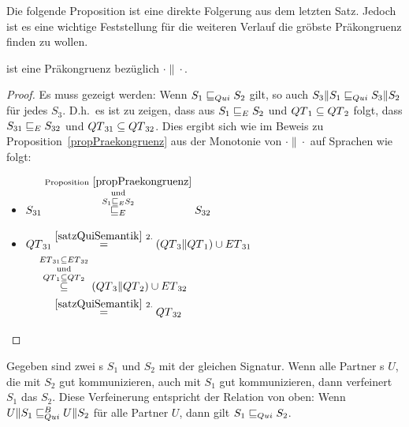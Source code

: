 Die folgende Proposition ist eine direkte Folgerung aus dem letzten Satz.
Jedoch ist es eine wichtige Feststellung für die weiteren Verlauf die gröbste
Präkongruenz finden zu wollen.

\begin{prop}[Präkongruenz]
  \label{propQuiPrae}
  \QRel{} ist eine Präkongruenz bezüglich $\cdot\|\cdot$.
\end{prop}

\begin{proof}
  Es muss gezeigt werden: Wenn $S_1\sqsubseteq _{Qui} S_2$ gilt, so auch
  $S_3\|S_1\sqsubseteq _{Qui} S_3\|S_2$ für jedes $S_3$. D.h.\ es ist zu zeigen, dass aus
  $S_1\sqsubseteq _E S_2$ und $QT{}_1\subseteq QT{}_2$ folgt, dass $S_{31}\sqsubseteq _E
  S_{32}$ und $QT{}_{31}\subseteq QT{}_{32}$. Dies ergibt sich wie im Beweis
  zu Proposition~\ref{propPraekongruenz} aus der Monotonie von $\cdot\|\cdot$
  auf Sprachen wie folgt:
  \begin{itemize}
    \item $\begin{aligned}[t]
        S_{31} \overset{\mathrm{Proposition}~
        \ref{propPraekongruenz}}{\overset{\mathrm{und}}{\overset{S_1\sqsubseteq _E
    S_2}{\sqsubseteq _E}}} S_{32}
    \end{aligned}$
    \item $\begin{aligned}[t]
        \QT{}_{31} &\overset{\ref{satzQuiSemantik}~2.}{=}
        (\QT{}_3\|\QT{}_1)\cup \ET{}_{31}\\
        &\hspace{-0.5cm}\overset{\ET{}_{31}\subseteq
      \ET{}_{32}}{\overset{\mathrm{und}}{\overset{\QT{}_1\subseteq
      \QT{}_2}{\subseteq}}} (\QT{}_3\|\QT{}_2) \cup \ET{}_{32}\\
        &\overset{\ref{satzQuiSemantik}~2.}{=} \QT{}_{32}
    \end{aligned}$
  \end{itemize}
\end{proof}

\begin{lem}
  \label{lemQuiVerfeinerung}
  Gegeben sind zwei \EIO{}s $S_1$ und $S_2$ mit der gleichen Signatur. Wenn
  alle Partner \EIO{}s $U$, die mit $S_2$  gut kommunizieren, auch mit $S_1$
  gut kommunizieren, dann verfeinert $S_1$ das \EIO{} $S_2$. Diese Verfeinerung
  entspricht der Relation \QRel{} von oben: Wenn $U\|S_1\sqsubseteq _{Qui}^B U\|S_2$ für alle
  Partner $U$, dann gilt $S_1\sqsubseteq _{Qui} S_2$. %
\end{lem}

